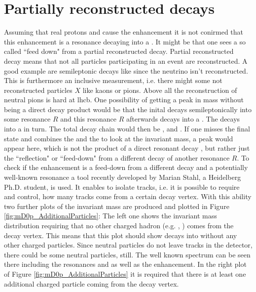 \section{Partially reconstructed decays}
Assuming that real protons and \Dz cause the enhancement it is not conirmed that this enhancement is a resonance decaying into a \Dz\proton.
It might be that one sees a so called ``feed down" from a partial reconstructed decay.
Partial reconstructed decay means that not all particles participating in an event are reconstructed.
A good example are semileptonic decays like \LbToDpmunuX since the neutrino isn't reconstructed.
This is furthermore an inclusive measurement, i.e. there might some not reconstructed particles $X$ like kaons or pions.
Above all the reconstruction of neutral pions is hard at lhcb.
One possibility of getting a peak in \Dz\proton mass without being a direct decay product would be that the inital \Lb decays semileptonically into some resonance $R$ and this resonance $R$ afterwards decays into a \Dstar\proton.
The \Dstar decays into a \D\pion in turn.
The total decay chain would then be ,  and \decay{\Dstar}{\D\pion}.
If one misses the final state \pion and combines the \D and the \proton to look at the invariant \D\proton mass, a peak would appear here, which is not the product of a direct resonant decay , but rather just the ``reflection" or ``feed-down" from a different decay of another resonance $R$.
To check if the enhancement is a feed-down from a different decay and a potentially well-known resonance a tool recently developed by Marian Stahl, a Heidelberg Ph.D. student, is used.
It enables to isolate tracks, i.e. it is possible to require and control, how many tracks come from a certain decay vertex.
With this ability two further plots of the \Dz\proton invariant mass are produced and plotted in Figure \ref{fig:mD0p_AdditionalParticles}:
The left one shows the invariant \Dz\proton mass distribution requiring that no other charged hadron (e.g. \pion, \kaon) comes from the \Dz\proton\mun decay vertex.
This means that this plot should show \Lb decays into \Dz\proton\mun without any other charged particles.
Since neutral particles do not leave tracks in the detector, there could be some neutral particles, still.
The well known \Dz\proton spectrum can be seen there including the resonances \LcResI and \LcResII as well as the enhancement.
In the right plot of Figure \ref{fig:mD0p_AdditionalParticles} it is required that there is at least one additional charged particle coming from the \Dz\proton\mun decay vertex.
